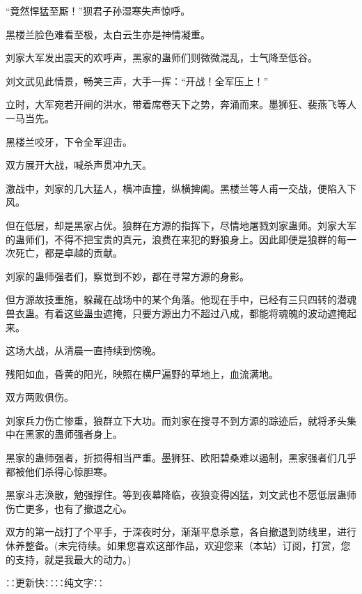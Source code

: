 \begin{this_body}
“竟然悍猛至厮！”狈君子孙湿寒失声惊呼。

黑楼兰脸色难看至极，太白云生亦是神情凝重。

刘家大军发出震天的欢呼声，黑家的蛊师们则微微混乱，士气降至低谷。

刘文武见此情景，畅笑三声，大手一挥：“开战！全军压上！”

立时，大军宛若开闸的洪水，带着席卷天下之势，奔涌而来。墨狮狂、裴燕飞等人一马当先。

黑楼兰咬牙，下令全军迎击。

双方展开大战，喊杀声贯冲九天。

激战中，刘家的几大猛人，横冲直撞，纵横捭阖。黑楼兰等人甫一交战，便陷入下风。

但在低层，却是黑家占优。狼群在方源的指挥下，尽情地屠戮刘家蛊师。刘家大军的蛊师们，不得不把宝贵的真元，浪费在来犯的野狼身上。因此即便是狼群的每一次死亡，都是卓越的贡献。

刘家的蛊师强者们，察觉到不妙，都在寻常方源的身影。

但方源故技重施，躲藏在战场中的某个角落。他现在手中，已经有三只四转的潜魂兽衣蛊。有着这些蛊虫遮掩，只要方源出力不超过八成，都能将魂魄的波动遮掩起来。

这场大战，从清晨一直持续到傍晚。

残阳如血，昏黄的阳光，映照在横尸遍野的草地上，血流满地。

双方两败俱伤。

刘家兵力伤亡惨重，狼群立下大功。而刘家在搜寻不到方源的踪迹后，就将矛头集中在黑家的蛊师强者身上。

黑家的蛊师强者，折损得相当严重。墨狮狂、欧阳碧桑难以遏制，黑家强者们几乎都被他们杀得心惊胆寒。

黑家斗志涣散，勉强撑住。等到夜幕降临，夜狼变得凶猛，刘文武也不愿低层蛊师伤亡更多，也有了撤退之心。

双方的第一战打了个平手，于深夜时分，渐渐平息杀意，各自撤退到防线里，进行休养整备。(未完待续。如果您喜欢这部作品，欢迎您来（本站）订阅，打赏，您的支持，就是我最大的动力。)

∷更新快∷∷纯文字∷

\end{this_body}

